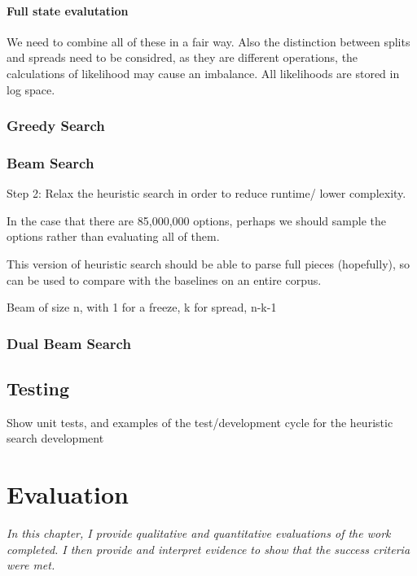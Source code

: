 \documentclass[12pt,a4paper,twoside,openright]{report}
\theoremstyle{definition}
\begin{document}
\FloatBarrier
\subsubsection{Full state evalutation}
We need to combine all of these in a fair way. Also the distinction between splits and spreads need to be considred, as they are different operations, the calculations of likelihood may cause an imbalance. All likelihoods are stored in log space.

\FloatBarrier
\subsection{Greedy Search}

\subsection{Beam Search}
Step 2: Relax the heuristic search in order to reduce runtime/ lower complexity.
\par 
In the case that there are 85,000,000 options, perhaps we should sample the options rather than evaluating all of them. 
\par 
This version of heuristic search should be able to parse full pieces (hopefully), so can be used to compare with the baselines on an entire corpus.
\par 
Beam of size n, with 1 for a freeze, k for spread, n-k-1 


\subsection{Dual Beam Search}

\section{Testing}
Show unit tests, and examples of the test/development cycle for the heuristic search development


\chapter{Evaluation}
\textit{In this chapter, I provide qualitative and quantitative evaluations of the work completed. I then provide and interpret evidence to show that the success criteria were met.}
\end{document}
